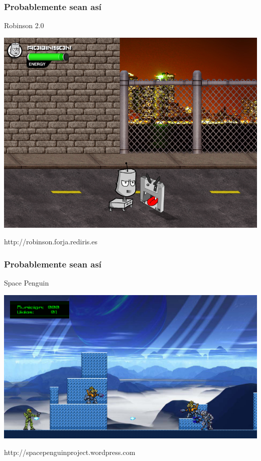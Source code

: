 \begin{frame}
	\frametitle{Probablemente sean así}

	\begin{center}
	Robinson 2.0
	
	    \includegraphics[scale=0.26]{img/robinson.png}
	    
	http://robinson.forja.rediris.es
	\end{center}
\end{frame}

\begin{frame}
	\frametitle{Probablemente sean así}

	\begin{center}
	Space Penguin
	
	    \includegraphics[scale=0.26]{img/spacepenguin.png}
	    
	http://spacepenguinproject.wordpress.com
	\end{center}
\end{frame}

